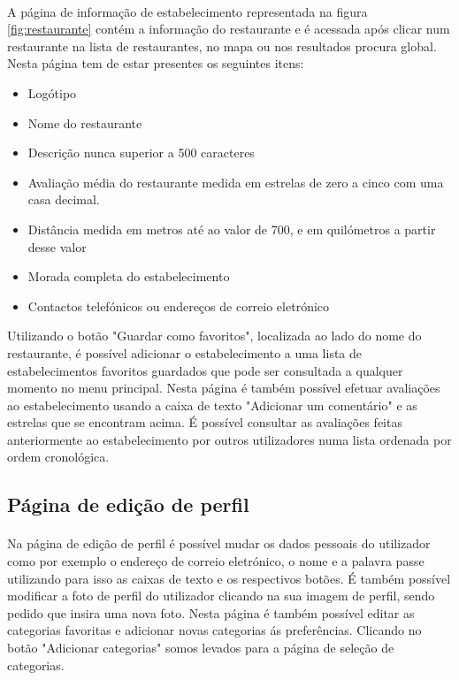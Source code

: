 \documentclass[a4paper,12pt]{scrreprt}
\begin{document}
\paragraph{}
A página de informação de estabelecimento representada na figura \ref{fig:restaurante} contém a informação do restaurante e é acessada após clicar num restaurante na lista de restaurantes, no mapa ou nos resultados procura global. Nesta página tem de estar presentes os seguintes itens:
\begin{itemize}
  \item Logótipo 
  \item Nome do restaurante
  \item Descrição nunca superior a 500 caracteres
  \item Avaliação média do restaurante medida em estrelas de zero a cinco com uma casa decimal.
  \item Distância medida em metros até ao valor de 700, e em quilómetros a partir desse valor
  \item Morada completa do estabelecimento
  \item Contactos telefónicos ou endereços de correio eletrónico
\end{itemize}
Utilizando o botão "Guardar como favoritos", localizada ao lado do nome do restaurante, é possível adicionar o estabelecimento a uma lista de estabelecimentos favoritos guardados que pode ser consultada a qualquer momento no menu principal.
Nesta página é também possível efetuar avaliações ao estabelecimento usando a caixa de texto "Adicionar um comentário"  e as estrelas que se encontram acima.
É possível consultar as avaliações feitas anteriormente ao estabelecimento por outros utilizadores numa lista ordenada por ordem cronológica.
\subsection{Página de edição de perfil}
\paragraph{}
Na página de edição de perfil é possível mudar os dados pessoais do utilizador como por exemplo o endereço de correio eletrónico, o nome e a palavra passe utilizando para isso as caixas de texto e os respectivos botões. É também possível modificar a foto de perfil do utilizador clicando na sua imagem de perfil, sendo pedido que insira uma nova foto.
Nesta página é também possível editar as categorias favoritas e adicionar novas categorias ás preferências. Clicando no botão "Adicionar categorias" somos levados para a página de seleção de categorias.
\end{document}
